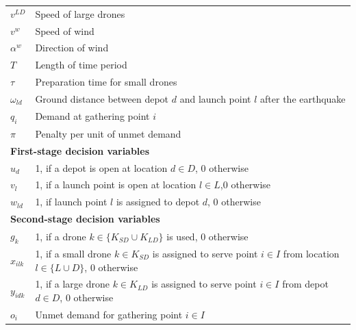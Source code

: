\documentclass[preprint,review,11pt,authoryear]{elsarticle}
\begin{document}
\begin{table}[h!]
{\begin{tabular}{ll}
$v^{LD}$                      & Speed of large drones                                                                      \\
$v^{w}$                       & Speed of wind                                                                              \\
$\alpha^{w}$                  & Direction of wind                                                                          \\
$T$                           & Length of time period                                                                      \\
$\tau$                        & Preparation time for small drones                                                          \\
$\omega_{ld}$                 & Ground distance between depot $d$ and launch point $l$ after the earthquake                \\
$q_i$                         & Demand at gathering point $i$                                                              \\
$\pi$                         & Penalty per unit of unmet demand                                                           \\
\multicolumn{2}{l}{\textbf{First-stage decision variables}}                                                                \\
$u_d$                         & 1, if a depot is open at location $d \in D$, 0 otherwise                                   \\
$v_l$                         & 1, if a launch point is open at location $l \in L$,0 otherwise                             \\
$w_{ld}$                      & 1, if launch point $l$ is assigned to depot $d$, 0 otherwise                               \\
\multicolumn{2}{l}{\textbf{Second-stage decision variables}}                                                               \\
$g_k$                         & 1, if a drone $k \in \{K_{SD} \cup K_{LD}\}$ is used, 0 otherwise                          \\
$x_{ilk}$                     & 1, if a small drone $k \in K_{SD}$ is assigned to serve point $i \in I$ from location $l \in \{L \cup D\}$, 0 otherwise \\
$y_{idk}$                     & 1, if a large drone $k \in K_{LD}$ is assigned to serve point $i \in I$ from depot $d \in D$, 0 otherwise \\
$o_i$                         & Unmet demand for gathering point $i \in I$                                                 \\
\bottomrule
\end{tabular}
}
\label{table:notation}
\end{table} 
\end{document}
